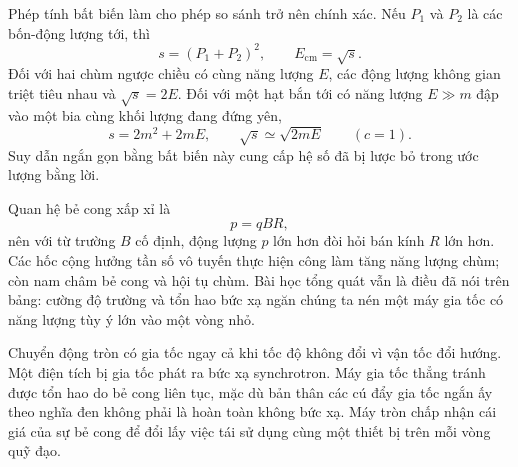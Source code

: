 Phép tính bất biến làm cho phép so sánh trở nên chính xác. Nếu \(P_1\) và \(P_2\) là các bốn-động lượng tới, thì
\begin{equation}
s=(P_1+P_2)^2,
\qquad E_{\mathrm{cm}}=\sqrt{s}.
\end{equation}
Đối với hai chùm ngược chiều có cùng năng lượng \(E\), các động lượng không gian triệt tiêu nhau và \(\sqrt{s}=2E\). Đối với một hạt bắn tới có năng lượng \(E\gg m\) đập vào một bia cùng khối lượng đang đứng yên,
\begin{equation}
s=2m^2+2mE,
\qquad
\sqrt{s}\simeq \sqrt{2mE}
\qquad (c=1).
\end{equation}
Suy dẫn ngắn gọn bằng bất biến này cung cấp hệ số đã bị lược bỏ trong ước lượng bằng lời.

\begin{classroomqa}
\end{classroomqa}

Quan hệ bẻ cong xấp xỉ là
\begin{equation}
p=qBR,
\end{equation}
nên với từ trường \(B\) cố định, động lượng \(p\) lớn hơn đòi hỏi bán kính \(R\) lớn hơn. Các hốc cộng hưởng tần số vô tuyến thực hiện công làm tăng năng lượng chùm; còn nam châm bẻ cong và hội tụ chùm. Bài học tổng quát vẫn là điều đã nói trên bảng: cường độ trường và tổn hao bức xạ ngăn chúng ta nén một máy gia tốc có năng lượng tùy ý lớn vào một vòng nhỏ.

Chuyển động tròn có gia tốc ngay cả khi tốc độ không đổi vì vận tốc đổi hướng. Một điện tích bị gia tốc phát ra bức xạ synchrotron. Máy gia tốc thẳng tránh được tổn hao do bẻ cong liên tục, mặc dù bản thân các cú đẩy gia tốc ngắn ấy theo nghĩa đen không phải là hoàn toàn không bức xạ. Máy tròn chấp nhận cái giá của sự bẻ cong để đổi lấy việc tái sử dụng cùng một thiết bị trên mỗi vòng quỹ đạo.

\begin{classroomqa}
\end{classroomqa}

